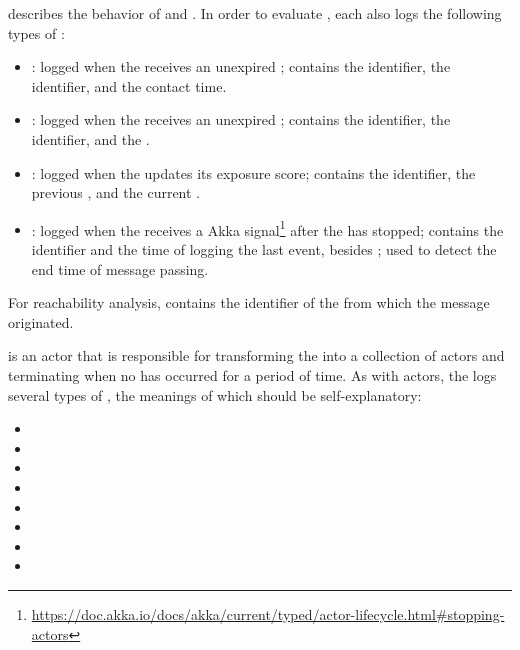  describes the behavior of  and . In order to evaluate , each  also logs the following types of :
\begin{itemize}
  \item {}: logged when the  receives an unexpired ; contains the  identifier, the  identifier, and the contact time.
  \item {}: logged when the  receives an unexpired ; contains the  identifier, the  identifier, and the .
  \item {}: logged when the  updates its exposure score; contains the  identifier, the previous , and the current .
  \item {}: logged when the  receives a  Akka signal\footnote{\url{https://doc.akka.io/docs/akka/current/typed/actor-lifecycle.html\#stopping-actors}} after the  has stopped; contains the  identifier and the time of logging the last event, besides ; used to detect the end time of message passing.
\end{itemize}
For reachability analysis,  contains the identifier of the  from which the message originated.

 is an actor that is responsible for transforming the  into a collection of  actors and terminating when no  has occurred for a period of time. As with  actors, the  logs several types of , the meanings of which should be self-explanatory:
\begin{multicols}{2}
\begin{itemize}
  \item {}
  \item {}
  \item {}
  \item {}
  \item {}
  \item {}
  \item {}
  \item {}
\end{itemize}  
\end{multicols}

